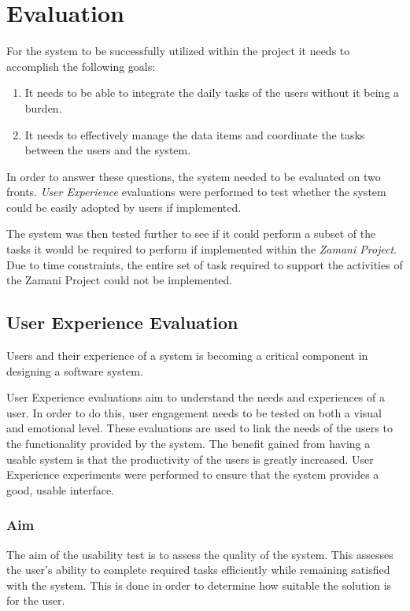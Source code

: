 \chapter{Evaluation\label{chap3}}

For the system to be successfully utilized within the project
it needs to accomplish the following goals:
\begin{enumerate}
\item It needs to be able to integrate the daily tasks of the users
      without it being a burden.
\item It needs to effectively  manage the data items and
      coordinate the tasks between the users and the system.
\end{enumerate}

In order to answer these questions, the system needed to be evaluated on two
fronts. \emph{User Experience} evaluations were performed to test whether the
system could be easily adopted by users if implemented.

The system was then tested further to see if it could perform
a subset of the tasks it would be required to perform if implemented within
the \emph{Zamani Project}. Due to time constraints, the entire set of task required
to support the activities of the Zamani Project could not be implemented.

\section{User Experience Evaluation}
Users and their experience of a system is becoming a critical component
in designing a software system\cite{Forlizzi:2004:UEI:1013115.1013152}.

User Experience evaluations aim to understand the needs and experiences of a user.
In order to do this, user engagement needs to be tested on both a visual and emotional level.
These evaluations are used to link the needs of the users to the functionality provided by the
system. The benefit gained from having a usable system is that the productivity
of the users is greatly increased\cite{nielsen2003usability}.
User Experience experiments were performed to ensure that the system
provides a good, usable interface.

\subsection{Aim}
The aim of the usability test is to assess the quality of the system. This
assesses the user's ability to complete required tasks efficiently while
remaining satisfied with the system\cite{bevan1995measuring}. This is done in
order to determine how suitable the solution is for the user.

